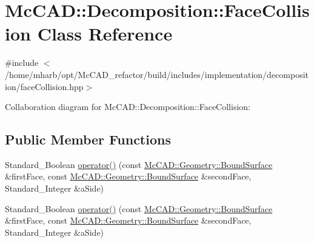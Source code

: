\hypertarget{classMcCAD_1_1Decomposition_1_1FaceCollision}{}\section{Mc\+C\+AD\+:\+:Decomposition\+:\+:Face\+Collision Class Reference}
\label{classMcCAD_1_1Decomposition_1_1FaceCollision}


{\ttfamily \#include $<$/home/mharb/opt/\+Mc\+C\+A\+D\+\_\+refactor/build/includes/implementation/decomposition/face\+Collision.\+hpp$>$}



Collaboration diagram for Mc\+C\+AD\+:\+:Decomposition\+:\+:Face\+Collision\+:
\subsection*{Public Member Functions}
\begin{DoxyCompactItemize}
\item 
Standard\+\_\+\+Boolean \hyperlink{classMcCAD_1_1Decomposition_1_1FaceCollision_a081f71aa83d64fca9a0d0483854f9e9d}{operator()} (const \hyperlink{classMcCAD_1_1Geometry_1_1BoundSurface}{Mc\+C\+A\+D\+::\+Geometry\+::\+Bound\+Surface} \&first\+Face, const \hyperlink{classMcCAD_1_1Geometry_1_1BoundSurface}{Mc\+C\+A\+D\+::\+Geometry\+::\+Bound\+Surface} \&second\+Face, Standard\+\_\+\+Integer \&a\+Side)
\item 
Standard\+\_\+\+Boolean \hyperlink{classMcCAD_1_1Decomposition_1_1FaceCollision_a081f71aa83d64fca9a0d0483854f9e9d}{operator()} (const \hyperlink{classMcCAD_1_1Geometry_1_1BoundSurface}{Mc\+C\+A\+D\+::\+Geometry\+::\+Bound\+Surface} \&first\+Face, const \hyperlink{classMcCAD_1_1Geometry_1_1BoundSurface}{Mc\+C\+A\+D\+::\+Geometry\+::\+Bound\+Surface} \&second\+Face, Standard\+\_\+\+Integer \&a\+Side)
\end{DoxyCompactItemize}
